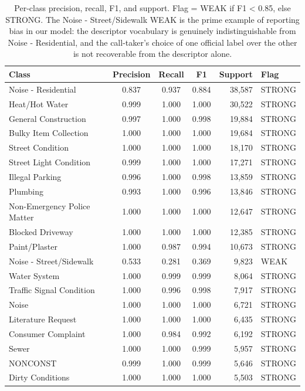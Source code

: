 \documentclass[11pt,letterpaper]{book}
\begin{document}
\begin{table}[h]
  \caption{Per-class precision, recall, F1, and support. Flag = WEAK if F1 < 0.85, else STRONG. The Noise - Street/Sidewalk WEAK is the prime example of reporting bias in our model: the descriptor vocabulary is genuinely indistinguishable from Noise - Residential, and the call-taker's choice of one official label over the other is not recoverable from the descriptor alone.}
  \label{tab:perclass-full}
  \centering
  \small
  \begin{tabular}{lcccrl}
    \toprule
    Class & Precision & Recall & F1 & Support & Flag \\
    \midrule
    Noise - Residential & 0.837 & 0.937 & 0.884 & 38,587 & STRONG \\
    Heat/Hot Water & 0.999 & 1.000 & 1.000 & 30,522 & STRONG \\
    General Construction & 0.997 & 1.000 & 0.998 & 19,884 & STRONG \\
    Bulky Item Collection & 1.000 & 1.000 & 1.000 & 19,684 & STRONG \\
    Street Condition & 1.000 & 1.000 & 1.000 & 18,170 & STRONG \\
    Street Light Condition & 0.999 & 1.000 & 1.000 & 17,271 & STRONG \\
    Illegal Parking & 0.996 & 1.000 & 0.998 & 13,859 & STRONG \\
    Plumbing & 0.993 & 1.000 & 0.996 & 13,846 & STRONG \\
    Non-Emergency Police Matter & 1.000 & 1.000 & 1.000 & 12,647 & STRONG \\
    Blocked Driveway & 1.000 & 1.000 & 1.000 & 12,385 & STRONG \\
    Paint/Plaster & 1.000 & 0.987 & 0.994 & 10,673 & STRONG \\
    Noise - Street/Sidewalk & 0.533 & 0.281 & 0.369 &  9,823 & WEAK \\
    Water System & 1.000 & 0.999 & 0.999 &  8,064 & STRONG \\
    Traffic Signal Condition & 1.000 & 0.996 & 0.998 &  7,917 & STRONG \\
    Noise & 1.000 & 1.000 & 1.000 &  6,721 & STRONG \\
    Literature Request & 1.000 & 1.000 & 1.000 &  6,435 & STRONG \\
    Consumer Complaint & 1.000 & 0.984 & 0.992 &  6,192 & STRONG \\
    Sewer & 1.000 & 1.000 & 0.999 &  5,957 & STRONG \\
    NONCONST & 0.999 & 1.000 & 0.999 &  5,646 & STRONG \\
    Dirty Conditions & 1.000 & 1.000 & 1.000 &  5,503 & STRONG \\
    \bottomrule
  \end{tabular}
\end{table}
\end{document}
